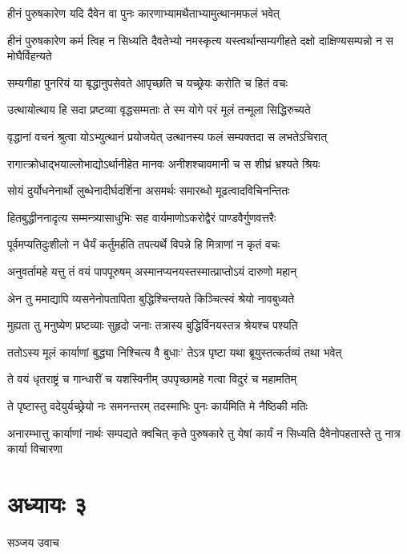 \twolineshloka
{हीनं पुरुषकारेण यदि दैवेन वा पुनः}
{कारणाभ्यामथैताभ्यामुत्थानमफलं भवेत्}


हीनं पुरुषकारेण कर्म त्विह न सिध्यति
\twolineshloka
{दैवतेभ्यो नमस्कृत्य यस्त्वर्थान्सम्यगीहते}
{दक्षो दाक्षिण्यसम्पन्नो न स मोघैर्विहन्यते}


\twolineshloka
{सम्यगीहा पुनरियं या बृद्धानुपसेवते}
{आपृच्छति च यच्छ्रेयः करोति च हितं वचः}


\twolineshloka
{उत्थायोत्थाय हि सदा प्रष्टव्या वृद्धसम्मताः}
{ते स्म योगे परं मूलं तन्मूला सिद्धिरुच्यते}


\twolineshloka
{वृद्धानां वचनं श्रुत्वा योऽभ्युत्थानं प्रयोजयेत्}
{उत्थानस्य फलं सम्यक्तदा स लभतेऽचिरात्}


\twolineshloka
{रागात्क्रोधाद्भयाल्लोभाद्योऽर्थानीहेत मानवः}
{अनीशश्चावमानी च स शीघ्रं भ्रश्यते श्रियः}


\twolineshloka
{सोयं दुर्योधनेनार्थो लुब्धेनादीर्घदर्शिना}
{असमर्थः समारब्धो मूढत्वादविचिनन्तितः}


\twolineshloka
{हितबुद्धीननादृत्य सम्मन्त्र्यासाधुभिः सह}
{वार्यमाणोऽकरोद्वैरं पाण्डवैर्गुणवत्तरैः}


\twolineshloka
{पूर्वमप्यतिदुःशीलो न धैर्यं कर्तुमर्हति}
{तपत्यर्थे विपन्ने हि मित्राणां न कृतं वचः}


\twolineshloka
{अनुवर्तामहे यत्तु तं वयं पापपूरुषम्}
{अस्मानप्यनयस्तस्मात्प्राप्तोऽयं दारुणो महान्}


\twolineshloka
{अेन तु ममाद्यापि व्यसनेनोपतापिता}
{बुद्धिश्चिन्तयते किञ्चित्स्वं श्रेयो नावबुध्यते}


\twolineshloka
{मुह्यता तु मनुष्येण प्रष्टव्याः सुहृदो जनाः}
{तत्रास्य बुद्धिर्विनयस्तत्र श्रेयश्च पश्यति}


\twolineshloka
{ततोऽस्य मूलं कार्याणां बुद्ध्या निश्चित्य वै बुधाः'}
{तेऽत्र पृष्टा यथा ब्रूयुस्तत्कर्तव्यं तथा भवेत्}


\twolineshloka
{ते वयं धृतराष्ट्रं च गान्धारीं च यशस्विनीम्}
{उपपृच्छामहे गत्वा विदुरं च महामतिम्}


\twolineshloka
{ते पृष्टास्तु वदेयुर्यच्छ्रेयो नः समनन्तरम्}
{तदस्माभिः पुनः कार्यमिति मे नैष्ठिकी मतिः}


अनारम्भात्तु कार्याणां नार्थः सम्पद्यते क्वचित्
\twolineshloka
{कृते पुरुषकारे तु येषां कार्यं न सिध्यति}
{दैवेनोपहतास्ते तु नात्र कार्या विचारणा}


\chapter{अध्यायः ३}
\twolineshloka
{सञ्जय उवाच}
{}



